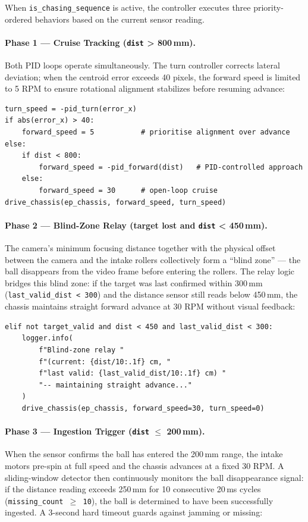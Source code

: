 When \texttt{is\_chasing\_sequence} is active, the controller executes three priority-ordered behaviors
based on the current sensor reading.

\paragraph{Phase 1 --- Cruise Tracking (\texttt{dist} > 800\,mm).}
Both PID loops operate simultaneously. The turn controller corrects lateral deviation; when the centroid error exceeds 40 pixels,
the forward speed is limited to 5 RPM to ensure rotational alignment stabilizes before resuming advance:

\begin{verbatim}
turn_speed = -pid_turn(error_x)
if abs(error_x) > 40:
    forward_speed = 5           # prioritise alignment over advance
else:
    if dist < 800:
        forward_speed = -pid_forward(dist)   # PID-controlled approach
    else:
        forward_speed = 30      # open-loop cruise
drive_chassis(ep_chassis, forward_speed, turn_speed)
\end{verbatim}

\paragraph{Phase 2 --- Blind-Zone Relay (target lost and \texttt{dist} < 450\,mm).}
The camera's minimum focusing distance together with the physical offset between the camera and the intake rollers
collectively form a ``blind zone'' --- the ball disappears from the video frame before entering the rollers.
The relay logic bridges this blind zone: if the target was last confirmed within 300\,mm
(\texttt{last\_valid\_dist < 300}) and the distance sensor still reads below
450\,mm, the chassis maintains straight forward advance at 30 RPM without visual feedback:

\begin{verbatim}
elif not target_valid and dist < 450 and last_valid_dist < 300:
    logger.info(
        f"Blind-zone relay "
        f"(current: {dist/10:.1f} cm, "
        f"last valid: {last_valid_dist/10:.1f} cm) "
        "-- maintaining straight advance..."
    )
    drive_chassis(ep_chassis, forward_speed=30, turn_speed=0)
\end{verbatim}

\paragraph{Phase 3 --- Ingestion Trigger (\texttt{dist} $\leq$ 200\,mm).}
When the sensor confirms the ball has entered the 200\,mm range, the intake motors pre-spin at full speed
and the chassis advances at a fixed 30 RPM. A sliding-window detector then continuously monitors the ball disappearance signal:
if the distance reading exceeds 250\,mm for 10 consecutive 20\,ms cycles (\texttt{missing\_count $\geq$ 10}),
the ball is determined to have been successfully ingested. A 3-second hard timeout guards against jamming or missing:


